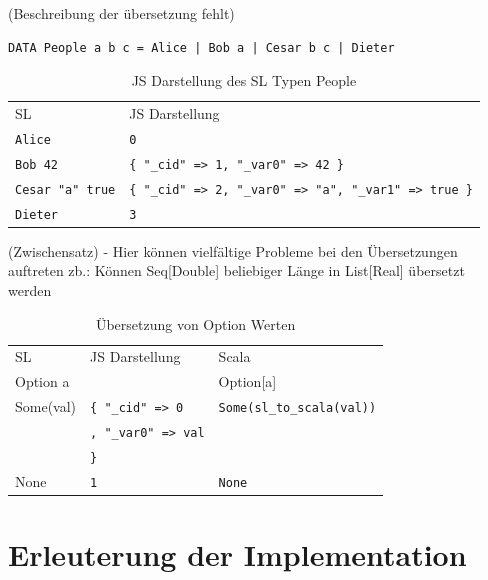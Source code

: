 \documentclass[12pt]{scrreprt}
\begin{document}
(Beschreibung der übersetzung fehlt)

\begin{lstlisting}[caption=Beispiel eines selbstedefinierten Typs, label=lst:bsp6]
DATA People a b c = Alice | Bob a | Cesar b c | Dieter
\end{lstlisting}

\begin{table}
\caption{JS Darstellung des \ac{SL} Typen People}
\centering
\begin{tabular}{ll}
 \ac{SL}              &  \ac{JS} Darstellung \\
\lstinline!Alice!           &  \lstinline!0! \\
\lstinline!Bob 42!          &  \lstinline!{ "_cid" => 1, "_var0" => 42 }! \\
\lstinline!Cesar "a" true!  &  \lstinline!{ "_cid" => 2, "_var0" => "a", "_var1" => true }! \\
\lstinline!Dieter!          &  \lstinline!3! \\
\end{tabular}
\end{table}


(Zwischensatz)
- Hier können vielfältige Probleme bei den Übersetzungen auftreten zb.: Können Seq[Double] beliebiger Länge in List[Real] übersetzt werden

\begin{table}
\caption{Übersetzung von Option Werten}
\centering
\begin{tabular}{lll}
 \ac{SL}        &   \ac{JS} Darstellung   &    Scala \\

Option a   &                    &   Option[a] \\

Some(val)   & \lstinline!{ "_cid" => 0!      &  \lstinline!Some(sl_to_scala(val))! \\
            & \lstinline!, "_var0" => val! \\
            & \lstinline!}! \\

None        & \lstinline!1!                  &  \lstinline!None! \\
\end{tabular}
\end{table}

\section{Erleuterung der Implementation}
\label{sec:trans-implementation}
\end{document}
